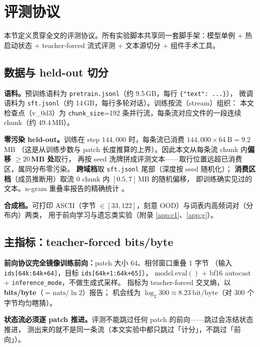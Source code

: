\section{评测协议}\label{sec:protocol}

本节定义贯穿全文的评测协议。所有实验脚本共享同一套脚手架：模型单例 + 热启动状态 + teacher-forced
流式评测 + 文本源切分 + 组件手术工具。

\subsection{数据与 held-out 切分}\label{sec:data}

\textbf{语料。}预训练语料为 \texttt{pretrain.jsonl}（约 9.5\,GB，每行 \texttt{\{"text": ...\}}），
微调语料为 \texttt{sft.jsonl}（约 14\,GB，每行多轮对话）。训练按流（stream）组织：
本文检查点（v\_0d3）为 \texttt{chunk\_size}=192 条并行流，每条流对应文件的一段连续 chunk（约 49.4\,MB）。

\textbf{零污染 held-out。}训练在 step $144{,}000$ 时，每条流已消费 $144{,}000\times64\ \mathrm{B}=9.2$\,MB
（这是从训练步数与 patch 长度推算的上界）。因此本文从每条流 chunk 内\textbf{偏移 $\ge20$\,MB 处}取行，
再按 seed 洗牌拼成评测文本——取行位置远超已消费区，属同分布零污染。
\textbf{跨域档}取 \texttt{sft.jsonl} 尾部（深度按 seed 随机化）；
\textbf{消费区档}（成员推断用）取流 0 chunk 内 $[0.5,7]$\,MB 的随机偏移，
即训练确实见过的文本。$\mathrm{n}$-gram 重叠率报告的精确统计 。

\textbf{合成档。}可打印 ASCII（字节 $\in[33,122]$，刻意 OOD）与词表内高频词对（分布内）两类，
用于前向学习与遗忘类实验（附录 \ref{app:c1}、\ref{app:g}）。

\subsection{主指标：teacher-forced bits/byte}\label{sec:metric}

\textbf{前向协议完全镜像训练前向：}patch 大小 $64$、相邻窗口重叠 1 字节
（输入 \texttt{ids[64k:64k+64]}，目标 \texttt{ids[64k+1:64k+65]}），
$\mathrm{model.eval}()$ + bf16 autocast + \texttt{inference\_mode}，不做生成式采样。
指标为 teacher-forced 交叉熵，以 \textbf{bits/byte}（$=\mathrm{nats}/\ln 2$）报告；
机会线为 $\log_2 300 \approx 8.23\ \mathrm{bit/byte}$（对 300 个字节均匀瞎猜）。

\textbf{状态流必须逐 patch 推进。}评测不能跳过任何 patch 的前向——跳过会冻结状态推进，
测出来的就不是同一条流（本文实验中都只跳过「计分」，不跳过「前向」）。

